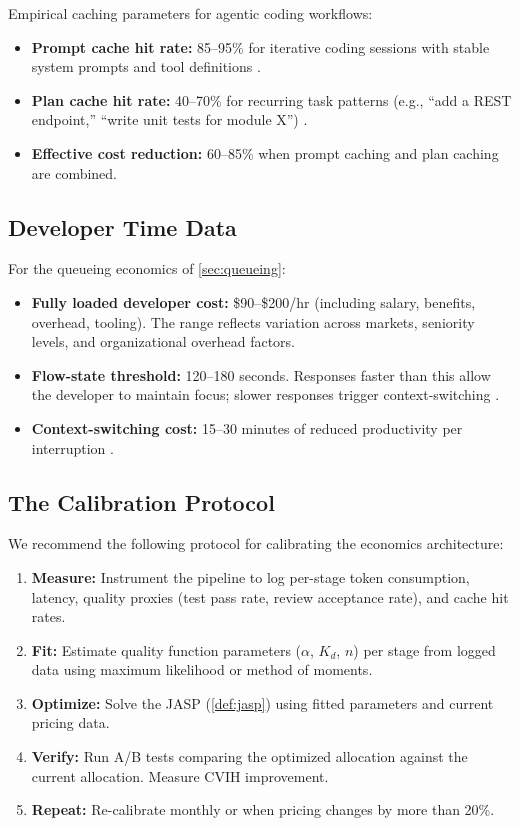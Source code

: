 \documentclass[11pt, a4paper, logo, copyright]{googledeepmind}
\begin{document}
Empirical caching parameters for agentic coding workflows:
\begin{itemize}[nosep]
    \item \textbf{Prompt cache hit rate:} 85--95\% for iterative coding sessions with stable system prompts and tool definitions \citep{anthropic2026coding, liang2026cache}.
    \item \textbf{Plan cache hit rate:} 40--70\% for recurring task patterns (e.g., ``add a REST endpoint,'' ``write unit tests for module X'') \citep{zhang2025plancache}.
    \item \textbf{Effective cost reduction:} 60--85\% when prompt caching and plan caching are combined.
\end{itemize}

\subsection{Developer Time Data}

For the queueing economics of \cref{sec:queueing}:
\begin{itemize}[nosep]
    \item \textbf{Fully loaded developer cost:} \$90--\$200/hr (including salary, benefits, overhead, tooling). The range reflects variation across markets, seniority levels, and organizational overhead factors.
    \item \textbf{Flow-state threshold:} 120--180 seconds. Responses faster than this allow the developer to maintain focus; slower responses trigger context-switching \citep{mark2008interrupted, leroy2009}.
    \item \textbf{Context-switching cost:} 15--30 minutes of reduced productivity per interruption \citep{mark2008interrupted}.
\end{itemize}

\subsection{The Calibration Protocol}

We recommend the following protocol for calibrating the economics architecture:
\begin{enumerate}[nosep]
    \item \textbf{Measure:} Instrument the pipeline to log per-stage token consumption, latency, quality proxies (test pass rate, review acceptance rate), and cache hit rates.
    \item \textbf{Fit:} Estimate quality function parameters ($\alpha$, $K_d$, $n$) per stage from logged data using maximum likelihood or method of moments.
    \item \textbf{Optimize:} Solve the JASP (\cref{def:jasp}) using fitted parameters and current pricing data.
    \item \textbf{Verify:} Run A/B tests comparing the optimized allocation against the current allocation. Measure CVIH improvement.
    \item \textbf{Repeat:} Re-calibrate monthly or when pricing changes by more than 20\%.
\end{enumerate}
\end{document}
